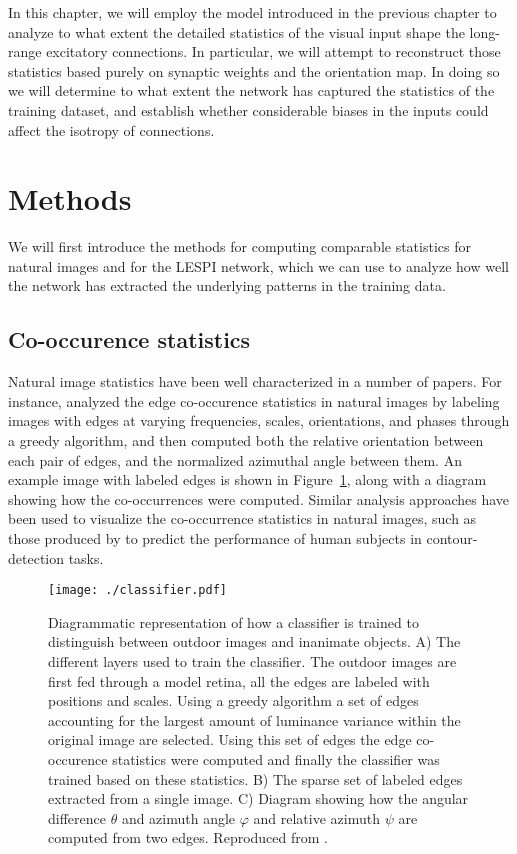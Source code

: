 In this chapter, we will employ the model introduced in the previous
chapter to analyze to what extent the detailed statistics of the
visual input shape the long-range excitatory connections.  In
particular, we will attempt to reconstruct those statistics based
purely on synaptic weights and the orientation map. In doing so we
will determine to what extent the network has captured the statistics
of the training dataset, and establish whether considerable biases in
the inputs could affect the isotropy of connections.

\section{Methods}

We will first introduce the methods for computing comparable
statistics for natural images and for the LESPI network, which we can
use to analyze how well the network has extracted the underlying
patterns in the training data.

\subsection{Co-occurence statistics}

Natural image statistics have been well characterized in a number of
papers. For instance, \cite{Perrinet2015} analyzed the edge
co-occurence statistics in natural images by labeling images with
edges at varying frequencies, scales, orientations, and phases through
a greedy algorithm, and then computed both the relative orientation
between each pair of edges, and the normalized azimuthal angle between
them. An example image with labeled edges is shown in
Figure~\ref{classifier}, along with a diagram showing how the
co-occurrences were computed. Similar analysis approaches have been
used to visualize the co-occurrence statistics in natural images, such
as those produced by \cite{Geisler2001} to predict the performance of
human subjects in contour-detection tasks.

\begin{figure}
	\centering
    \texttt{[image: ./classifier.pdf]}
	\caption[] {Diagrammatic representation of how a classifier is
      trained to distinguish between outdoor images and inanimate
      objects. A) The different layers used to train the
      classifier. The outdoor images are first fed through a model
      retina, all the edges are labeled with positions and
      scales. Using a greedy algorithm a set of edges accounting for
      the largest amount of luminance variance within the original
      image are selected. Using this set of edges the edge
      co-occurence statistics were computed and finally the classifier
      was trained based on these statistics. B) The sparse set
      of labeled edges extracted from a single image. C) Diagram
      showing how the angular difference $\theta$ and azimuth angle
      $\varphi$ and relative azimuth $\psi$ are computed from two
      edges. Reproduced from \cite{Perrinet2015}.}
	\label{classifier}
\end{figure}

